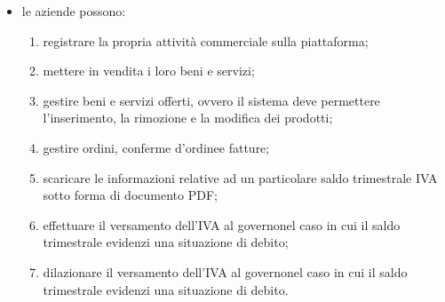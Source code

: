 \begin{itemize}
\begin{enumerate}[label=\alph*.]
		\begin{itemize}
			\item \textbf{deposito dei beni}: il cliente, durante il procedimento di acquisto, versa la somma dovuta nella piattaforma, dove verrà momentaneamente trattenuta. Il cliente riceve una conferma d'ordine\glosp nella sezione apposita del proprio account, e l'ordine viene aggiunto alle vendite in attesa di conferma nella sezione apposita dell'account dell'azienda-venditrice. La vera fattura conterrà gli stessi dati della conferma d'ordine\glo, ma verrà compilata all'approvazione di quest'ultima, per poter riportare la data corretta. La compilazione sarà eseguita dal sistema, che sta agendo da garante nel meccanismo di escrow\glo, ed è attualmente in possesso di entrambi gli oggetti della transazione/scambio;
			\item \textbf{riscatto beni}: all'approvazione, esplicita o automatica, della conferma d'ordine\glosp da parte del cliente, esso riceve la fattura, mentre l'azienda-venditrice riceve l'ammontare trattenuto dal sistema e può accedere alla fattura a sua volta.
		\end{itemize}
		Questo sistema è atto a garantire che ad ogni ordine il cliente riceva la fattura per dimostrare l'acquisto effettuato, e che l'azienda-venditrice riceva il pagamento. Con l'adozione di tale meccanismo viene semplificata la gestione dell'IVA, in quanto tutte le fatture emesse sono state approvate, e quindi da considerarsi prive di errori. 
	\end{enumerate}
	\item le aziende possono:
	\begin{enumerate}[label=\alph*.]
		\item registrare la propria attività commerciale sulla piattaforma;
		\item mettere in vendita i loro beni e servizi;
		\item gestire beni e servizi offerti, ovvero il sistema deve permettere l'inserimento, la rimozione e la modifica dei prodotti;
		\item gestire ordini, conferme d'ordine\glosp e fatture;	
		\item scaricare le informazioni relative ad un particolare saldo trimestrale IVA  sotto forma di documento PDF;
		\item effettuare il versamento dell'IVA al governo\glosp nel caso in cui il saldo trimestrale evidenzi una situazione di debito;
		\item dilazionare il versamento dell'IVA al governo\glosp nel caso in cui il saldo trimestrale evidenzi una situazione di debito.
	\end{enumerate}

\end{itemize}
